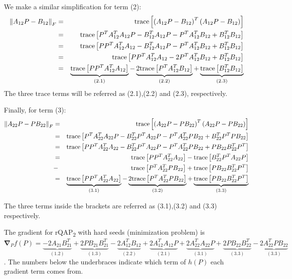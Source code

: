 \documentclass[12pt,oneside,final]{thesis}\usepackage[]{graphicx}\usepackage[]{color}
\begin{document}
We make a similar simplification for term (2):
\begin{align*}
\left\Vert A_{12}P-B_{12}\right\Vert _{F} & = & \textup{trace}\left[\left(A_{12}P-B_{12}\right)^{T}\left(A_{12}P-B_{12}\right)\right]\\
 & = & \textup{trace}\left[ P^{T}A_{12}^{T}A_{12}P-B_{12}^{T}A_{12}P-P^{T}A_{12}^{T}B_{12}+B_{12}^{T}B_{12}\right]\\
 & = & \textup{trace}\left[ PP^{T}A_{12}^{T}A_{12}-B_{12}^{T}A_{12}P-P^{T}A_{12}^{T}B_{12}+B_{12}^{T}B_{12}\right]\\
 & = & \textup{trace}\left[ PP^{T}A_{12}^{T}A_{12}-2P^{T}A_{12}^{T}B_{12}+B_{12}^{T}B_{12}\right] \\
 & =  & \underbrace{\textup{trace}\left[ PP^{T}A_{12}^{T}A_{12}\right]}_{(2.1)}
 -\underbrace{2 \textup{trace} \left[P^{T}A_{12}^{T}B_{12}\right]}_{(2.2)}
 +\underbrace{\textup{trace} \left[B_{12}^{T}B_{12}\right]}_{(2.3)}
\end{align*}
The three trace terms will be referred as (2.1),(2.2) and
(2.3), respectively.

Finally, for term (3):
\begin{align*}
\left\Vert A_{22}P-PB_{22}\right\Vert _{F} &=&\textup{trace}\left[\left(A_{22}P-PB_{22}\right)^{T}\left(A_{22}P-PB_{22}\right)\right]\\
 &=&\textup{trace}\left[P^{T}A_{22}^{T}A_{22}P-B_{22}^{T}P^{T}A_{22}P-P^{T}A_{22}^{T}PB_{22}+B_{22}^{T}P^{T}PB_{22}\right]\\
 &=&\textup{trace}\left[PP^{T}A_{22}^{T}A_{22}-B_{22}^{T}P^{T}A_{22}P-P^{T}A_{22}^{T}PB_{22}+PB_{22}B_{22}^{T}P^{T}\right]\\
  &=& {\textup{trace}\left[PP^{T}A_{22}^{T}A_{22}\right]}
 - {\textup{trace}\left[ B_{22}^{T}P^{T}A_{22}P\right]}\\
 &-&{\textup{trace}\left[P^{T}A_{22}^{T}PB_{22}\right]}
 +{\textup{trace}\left[ PB_{22}B_{22}^{T}P^{T}\right]}\\
 &=&\underbrace{\textup{trace}\left[PP^{T}A_{22}^{T}A_{22}\right]}_{(3.1)}
 -\underbrace{2\textup{trace}\left[P^{T}A_{22}^{T}PB_{22}\right]}_{(3.2)}
 +\underbrace{\textup{trace}\left[ PB_{22}B_{22}^{T}P^{T}\right]}_{(3.3)}
\end{align*}

The three terms inside the brackets are referred as (3.1),(3.2)  and (3.3)
  respectively.



The gradient for rQAP\textsubscript{2} with hard seeds (minimization problem) is
$\boldsymbol{\nabla}_{P}f(P)=
\underbrace{-2A_{21}B_{21}^{T}}_{(1.2)}
+\underbrace{2PB_{21}B_{21}^{T}}_{(1.3)}
-\underbrace{2A_{12}^{T}B_{12}}_{(2.2)}
+\underbrace{2A_{12}^{T}A_{12}P}_{(2.1)}
+\underbrace{2A_{22}^{T}A_{22}P}_{(3.1)}
+\underbrace{2PB_{22}B_{22}^{T}}_{(3.3)}
-\underbrace{2A_{22}^{T}PB_{22}}_{(3.3)}$. The numbers below the underbraces indicate which term  of $h(P)$ each gradient term comes from.
\end{document}
